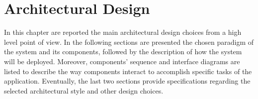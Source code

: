 \chapter{Architectural Design}

In this chapter are reported the main architectural design choices from a high level point of view. In the following sections are presented the chosen paradigm of the system and its components, followed by the description of how the system will be deployed. Moreover, components’ sequence and interface  diagrams are listed to describe the way components interact to accomplish specific tasks of the application. Eventually, the last two sections provide specifications regarding the selected architectural style and other design choices.








